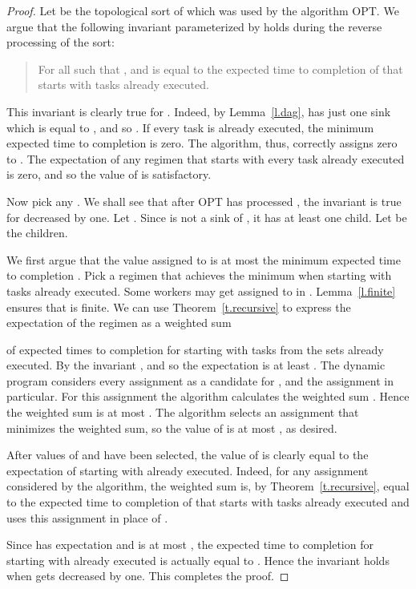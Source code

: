 \documentclass[letterpaper,11pt]{article}
\begin{document}
\begin{proof}
Let  be the topological sort of  which was used by the algorithm OPT. We argue that the following invariant parameterized by  holds during the reverse processing of the sort:
\begin{quote}
For all  such that ,  and  is equal to the expected time to completion of  that starts with tasks  already executed.
\end{quote}

This invariant is clearly true for . Indeed, by Lemma~\ref{l.dag},  has just one sink which is equal to , and so . If every task is already executed, the minimum expected time to completion is zero. The algorithm, thus, correctly assigns zero to . The expectation of any regimen that starts with every task already executed is zero, and so the value of  is satisfactory.

Now pick any . We shall see that after OPT has processed , the invariant is true for  decreased by one. Let . Since  is not a sink of , it has at least one child. Let  be the children.

We first argue that the value assigned to  is at most the minimum expected time to completion .
Pick a regimen  that achieves the minimum when starting with tasks  already executed. Some workers may get assigned to  in . Lemma~\ref{l.finite} ensures that  is finite. We can use Theorem~\ref{t.recursive} to express the expectation of the regimen as a weighted sum 

of expected times  to completion for  starting with tasks from the sets  already executed. By the invariant , and so the expectation  is at least . The dynamic program considers every assignment as a candidate for , and the assignment  in particular. For this assignment the algorithm calculates the weighted sum . Hence the weighted sum is at most . The algorithm selects an assignment that minimizes the weighted sum, so the value of  is at most , as desired.

After values of  and  have been selected, the value of  is clearly equal to the expectation of  starting with  already executed. Indeed, for any assignment considered by the algorithm, the weighted sum is, by Theorem~\ref{t.recursive}, equal to the expected time to completion of  that starts with tasks  already executed and uses this assignment in place of .

Since  has expectation  and  is at most , the expected time to completion for  starting with  already executed is actually equal to . Hence the invariant holds when  gets decreased by one. This completes the proof.
\end{proof}
\end{document}
